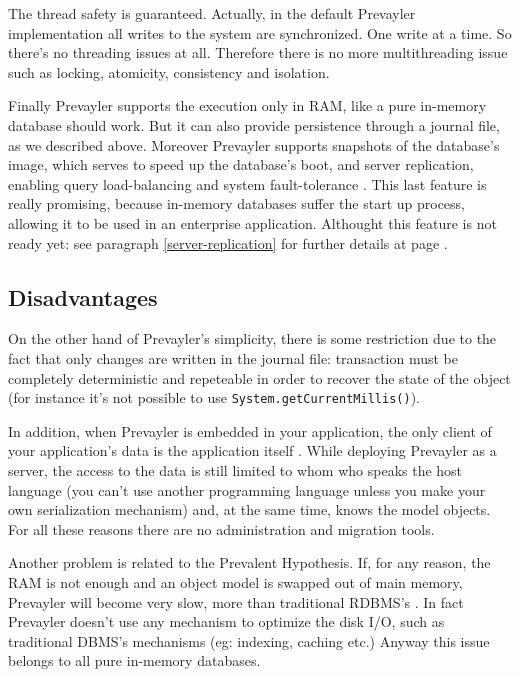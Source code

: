			The thread safety is guaranteed. Actually, in the default Prevayler implementation all writes to the 
			system are synchronized. One write at a time. So there's no threading issues at all. Therefore 
			there is no more multithreading issue such as locking, atomicity, consistency and isolation.
			
			Finally Prevayler supports the execution only in RAM, like a pure in-memory database should work. But 
			it can also provide persistence through a journal file, as we described above. Moreover Prevayler 
			supports snapshots of the database's image, which serves to speed up the database's boot, 
			and server replication, enabling query load-balancing and 
			system fault-tolerance \cite{Prevayler}. This last feature is really promising, 
			because in-memory databases suffer the start up 
			process, allowing it to be used in an enterprise application. Althought this feature is not ready yet: 
			see paragraph \ref{server-replication} for further details at page \pageref{server-replication}.
    			
			\subsection{Disadvantages}
			On the other hand of Prevayler's simplicity, there is some restriction due to the fact that only changes 
			are written in the journal file: transaction must be completely deterministic and repeteable in order 
			to recover the state of the object (for instance it's not possible to use \lstinline!System.getCurrentMillis()!).
			
			In addition, when Prevayler is embedded in your application, the only client 
			of your application's data is the application itself \cite{Hobbs}. While deploying Prevayler as a server, 
			the access to the data is still limited to whom who speaks the host 
			language (you can't use another programming language unless you make your own serialization mechanism) and, 
			at the same time, knows the model objects. For all these reasons there are no administration and migration tools.
						
			Another problem is related to the Prevalent Hypothesis. If, for any reason, the RAM is not enough and 
			an object model is 
			swapped out of main memory, Prevayler will become very slow, more than traditional RDBMS's \cite{Miller}. 
			In fact Prevayler doesn't use any mechanism to optimize the disk I/O, such as traditional DBMS's mechanisms 
			(eg: indexing, caching etc.) Anyway this issue belongs to all pure in-memory databases.
					
